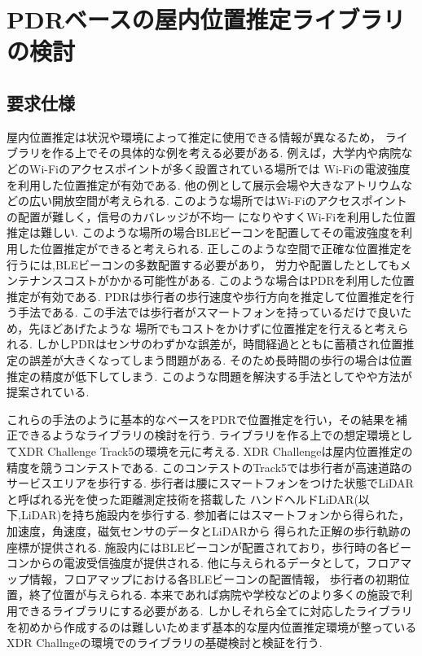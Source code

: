 
\section{PDRベースの屋内位置推定ライブラリの検討}

\subsection{要求仕様}
屋内位置推定は状況や環境によって推定に使用できる情報が異なるため，
ライブラリを作る上でその具体的な例を考える必要がある.
例えば，大学内や病院などのWi-Fiのアクセスポイントが多く設置されている場所では
Wi-Fiの電波強度を利用した位置推定が有効である.
他の例として展示会場や大きなアトリウムなどの広い開放空間が考えられる.
このような場所ではWi-Fiのアクセスポイントの配置が難しく，信号のカバレッジが不均一
になりやすくWi-Fiを利用した位置推定は難しい.
このような場所の場合BLEビーコンを配置してその電波強度を利用した位置推定ができると考えられる.
正しこのような空間で正確な位置推定を行うには,BLEビーコンの多数配置する必要があり，
労力や配置したとしてもメンテナンスコストがかかる可能性がある.
このような場合はPDRを利用した位置推定が有効である.
PDRは歩行者の歩行速度や歩行方向を推定して位置推定を行う手法である.
この手法では歩行者がスマートフォンを持っているだけで良いため，先ほどあげたような
場所でもコストをかけずに位置推定を行えると考えられる.
しかしPDRはセンサのわずかな誤差が，時間経過とともに蓄積され位置推定の誤差が大きくなってしまう問題がある.
そのため長時間の歩行の場合は位置推定の精度が低下してしまう.
このような問題を解決する手法として\cite{pdr-wifi}や\cite{pdr-ble}や方法が提案されている.

これらの手法のように基本的なベースをPDRで位置推定を行い，その結果を補正できるようなライブラリの検討を行う.
ライブラリを作る上での想定環境としてXDR Challenge Track5の環境を元に考える.
XDR Challengeは屋内位置推定の精度を競うコンテストである.
このコンテストのTrack5では歩行者が高速道路のサービスエリアを歩行する.
歩行者は腰にスマートフォンをつけた状態でLiDARと呼ばれる光を使った距離測定技術を搭載した
ハンドヘルドLiDAR(以下,LiDAR)を持ち施設内を歩行する.
参加者にはスマートフォンから得られた，加速度，角速度，磁気センサのデータとLiDARから
得られた正解の歩行軌跡の座標が提供される.
施設内にはBLEビーコンが配置されており，歩行時の各ビーコンからの電波受信強度が提供される.
他に与えられるデータとして，フロアマップ情報，フロアマップにおける各BLEビーコンの配置情報，
歩行者の初期位置，終了位置が与えられる.
本来であれば病院や学校などのより多くの施設で利用できるライブラリにする必要がある.
しかしそれら全てに対応したライブラリを初めから作成するのは難しいためまず基本的な屋内位置推定環境が整っている
XDR Challngeの環境でのライブラリの基礎検討と検証を行う.
